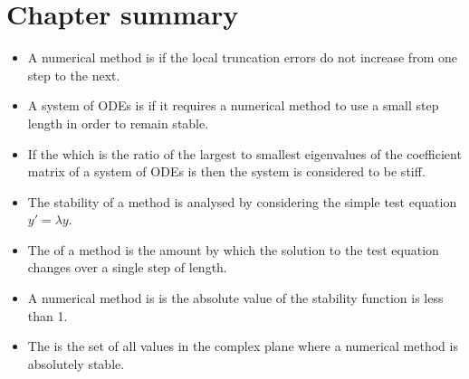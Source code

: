 \documentclass[letterpaper,10pt,english]{jupyterBook}
\begin{document}
\section{Chapter summary}
\label{\detokenize{4_Stability/4.4_Stability_summary:chapter-summary}}\label{\detokenize{4_Stability/4.4_Stability_summary::doc}}\begin{itemize}
\item {} 
\sphinxAtStartPar
A numerical method is {\hyperref[\detokenize{4_Stability/4.0_Stability:stability-definition}]{}} if the local truncation errors do not increase from one step to the next.

\item {} 
\sphinxAtStartPar
A system of ODEs is {\hyperref[\detokenize{4_Stability/4.0_Stability:stiffness-section}]{}} if it requires a numerical method to use a small step length in order to remain stable.

\item {} 
\sphinxAtStartPar
If the {\hyperref[\detokenize{4_Stability/4.0_Stability:stiffness-ratio-definition}]{}} which is the ratio of the largest to smallest eigenvalues of the coefficient matrix of a system of ODEs is  then the system is considered to be stiff.

\item {} 
\sphinxAtStartPar
The stability of a method is analysed by considering the simple test equation \(y' =\lambda y\).

\item {} 
\sphinxAtStartPar
The {\hyperref[\detokenize{4_Stability/4.1_Stability_functions:stability-function-definition}]{}} of a method is the amount by which the solution to the test equation changes over a single step of length.

\item {} 
\sphinxAtStartPar
A numerical method is {\hyperref[\detokenize{4_Stability/4.1_Stability_functions:stability-function-definition}]{}} is the absolute value of the stability function is less than 1.

\item {} 
\sphinxAtStartPar
The {\hyperref[\detokenize{4_Stability/4.1_Stability_functions:region-of-absolute-stability-definition}]{}} is the set of all values in the complex plane where a numerical method is absolutely stable.


\end{itemize}
\end{document}
